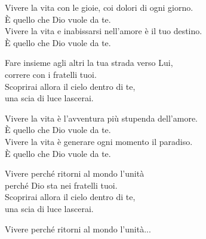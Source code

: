 
\strofa Vivere la vita con le gioie, coi dolori di ogni giorno.\\
È quello che Dio vuole da te.\\
Vivere la vita e inabissarsi nell'amore è il tuo destino.\\
È quello che Dio vuole da te.

\spazio

Fare insieme agli altri la tua strada verso Lui,\\
correre con i fratelli tuoi.\\
Scoprirai allora il cielo dentro di te,\\
una scia di luce lascerai.

\spazio

\strofa Vivere la vita è l'avventura più stupenda dell'amore.\\
È quello che Dio vuole da te.\\
Vivere la vita è generare ogni momento il paradiso.\\
È quello che Dio vuole da te.

\spazio

Vivere perché ritorni al mondo l'unità\\
perché Dio sta nei fratelli tuoi.\\
Scoprirai allora il cielo dentro di te,\\
una scia di luce lascerai.

\spazio

Vivere perché ritorni al mondo l'unità...